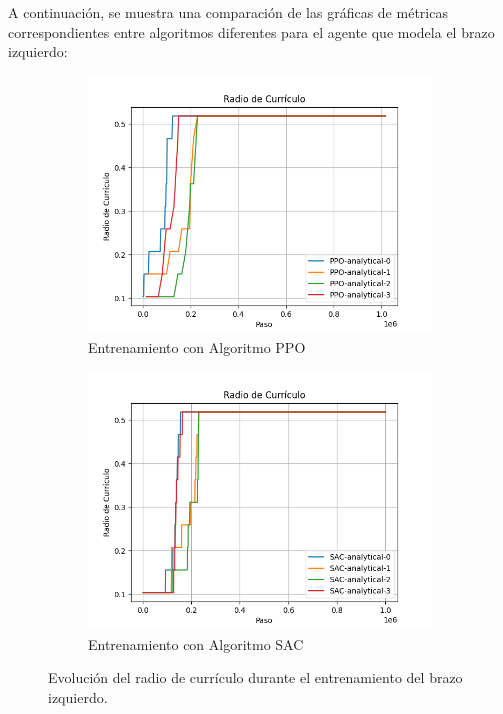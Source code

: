 A continuación, se muestra una comparación de las gráficas de métricas correspondientes entre algoritmos diferentes para el agente que modela el brazo izquierdo:

\begin{figure}[h!]
	\centering
	
	\begin{subfigure}[b]{0.48\textwidth}
		\centering
		\includegraphics[width=\textwidth]{images/graphs/PPO/Left/curriculum_radius}
		\caption{Entrenamiento con Algoritmo PPO}
		\label{fig:train-ppo-curr-left}
	\end{subfigure}
	\hfill
	\begin{subfigure}[b]{0.48\textwidth}
		\centering
		\includegraphics[width=\textwidth]{images/graphs/SAC/Left/curriculum_radius}
		\caption{Entrenamiento con Algoritmo SAC}
		\label{fig:train-sac-curr-left}
	\end{subfigure}
	
	\caption{Evolución del radio de currículo durante el entrenamiento del brazo izquierdo.}
	\label{fig:train-curr-left}
\end{figure}

